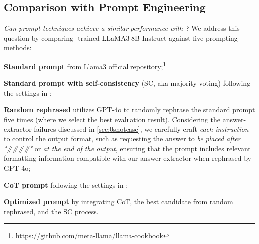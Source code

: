 
\subsection{Comparison with Prompt Engineering}\label{sec:prompt_method}
\emph{Can prompt techniques %
achieve a similar performance with {\langname}?}
We address this question by comparing {\langname}-trained LLaMA3-8B-Instruct against five prompting methods:
\begin{enumerate*}[label=(\roman*)]
    \item \textbf{Standard prompt} from Llama3 official repository;\footnote{\url{https://github.com/meta-llama/llama-cookbook}}
    \item \textbf{Standard prompt with self-consistency} (SC, aka majority voting) following the settings in \cite{DBLP:conf/iclr/0002WSLCNCZ23};
    \item \textbf{Random rephrased} utilizes GPT-4o to randomly rephrase the standard prompt five times (where we select the best evaluation result). 
    Considering the answer-extractor failures discussed in \cref{sec:0shotcase}, we carefully craft \emph{each instruction} to control the output format, such as requesting the answer to \emph{be placed after "\#\#\#\#"} or \emph{at the end of the output}, ensuring that the prompt includes relevant formatting information compatible with our answer extractor when rephrased by GPT-4o;
    \item \textbf{CoT prompt} following the settings in \cite{DBLP:conf/nips/Wei0SBIXCLZ22};
    \item \textbf{Optimized prompt} by integrating CoT, the best candidate from random rephrased, and the SC process.
\end{enumerate*}

